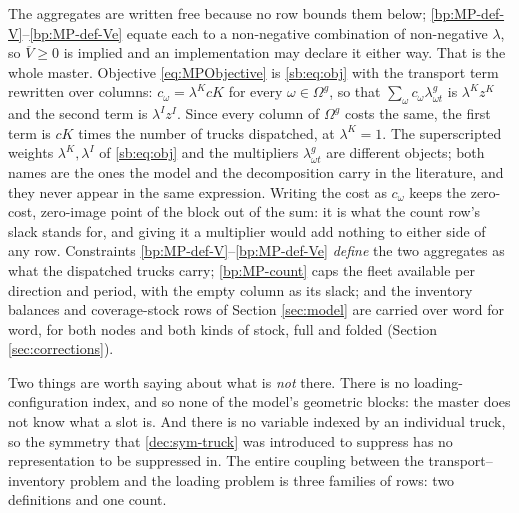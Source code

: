 The aggregates are written free because no row bounds them below;
\eqref{bp:MP-def-V}--\eqref{bp:MP-def-Ve} equate each to a non-negative
combination of non-negative $\lambda$, so $\overline{V}\ge0$ is implied
and an implementation may declare it either way.
That is the whole master. Objective \eqref{eq:MPObjective} is
\eqref{sb:eq:obj} with the transport term rewritten over columns:
$c_{\omega}=\lambda^{K}cK$ for every $\omega\in\Omega^{g}$, so that
$\sum_{\omega}c_{\omega}\lambda^{g}_{\omega t}$ is $\lambda^{K}z^{K}$
and the second term is $\lambda^{I}z^{I}$. Since every column of
$\Omega^{g}$ costs the same, the first term is $cK$ times the number of
trucks dispatched, at $\lambda^{K}=1$. The superscripted weights
$\lambda^{K},\lambda^{I}$ of \eqref{sb:eq:obj} and the multipliers
$\lambda^{g}_{\omega t}$ are different objects; both names are the ones
the model and the decomposition carry in the literature, and they never
appear in the same expression. Writing the cost as $c_{\omega}$ keeps
the zero-cost, zero-image point of the block out of the sum: it is what
the count row's slack stands for, and giving it a multiplier would add
nothing to either side of any row.
Constraints
\eqref{bp:MP-def-V}--\eqref{bp:MP-def-Ve} \emph{define} the two
aggregates as what the dispatched trucks carry; \eqref{bp:MP-count}
caps the fleet available per direction and period, with the empty
column as its slack; and the inventory balances and coverage-stock
rows of Section \ref{sec:model} are carried over word for word, for
both nodes and both kinds of stock, full and folded (Section
\ref{sec:corrections}).

Two things are worth saying about what is \emph{not} there. There is no
loading-configuration index, and so none of the model's geometric
blocks: the master does not know what a slot is. And there is no
variable indexed by an individual truck, so the symmetry that
\eqref{dec:sym-truck} was introduced to suppress has no
representation to be suppressed in. The entire coupling between the
transport--inventory problem and the loading problem is three families
of rows: two definitions and one count.

